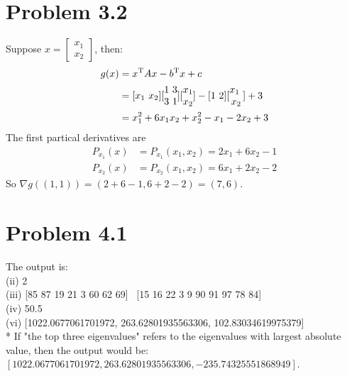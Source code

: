 \documentclass[twoside,11pt]{homework}
\begin{document}
{\section*{Problem 3.2}
Suppose $x = \left[ \begin{smallmatrix} x_1 \\ x_2 \end{smallmatrix} \right]$, then:
%
\begin{equation}
\begin{split}
g(x) &= x^{\rm{T}} A x - b^{\rm{T}} x + c \\
       &= [\begin{matrix}x_1\ x_2 \end{matrix}] [\begin{matrix} 1\ 3 \\ 3\ 1 \end{matrix}]  [\begin{matrix}x_1 \\ x_2 \end{matrix}] - [\begin{matrix}1\  2 \end{matrix}] [\begin{matrix}x_1\ \\ x_2 \end{matrix}] + 3 \\
       &= x_1^2 + 6x_1x_2 + x_2^2  - x_1 - 2x_2 + 3
\end{split}
\label{E7}
\end{equation}
%
The first partical derivatives are
%
\begin{equation}
\begin{split}
P_{x_1}(x) &= P_{x_1}(x_1, x_2) = 2x_1 + 6x_2 - 1 \\
P_{x_2}(x) &= P_{x_2}(x_1, x_2) = 6x_1 + 2x_2 - 2
\end{split}
\label{E8}
\end{equation}
%
So $\nabla g((1, 1)) = (2+6-1, 6+2-2) = (7, 6)$.

\newpage

\section*{Problem 4.1}
The output is:\\ \vspace{3 mm}
(ii) 2 \\\vspace{3 mm}
(iii) [85 87 19 21  3 60 62 69] \ [15 16 22  3  9 90 91 97 78 84] \\\vspace{3 mm}
(iv) 50.5 \\\vspace{3 mm}
(vi) [1022.0677061701972, 263.62801935563306, 102.83034619975379] \\
* If "the top three eigenvalues" refers to the eigenvalues with largest absolute value, then the output would be: 
$\left[1022.0677061701972, 263.62801935563306, -235.74325551868949\right]$.

}
\end{document}

